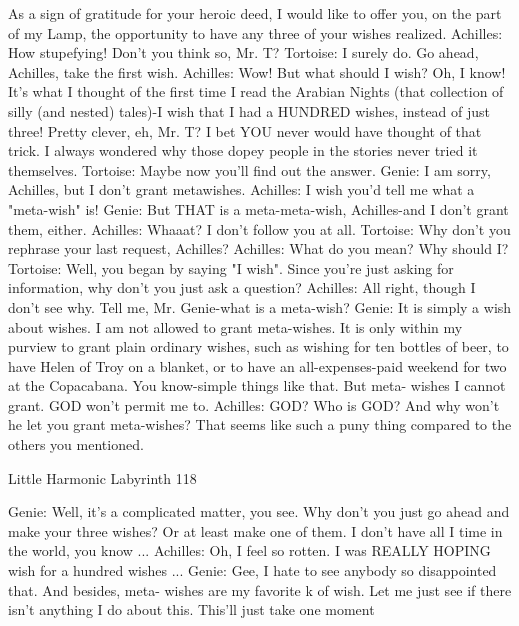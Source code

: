           As a sign of gratitude for your heroic deed, I would like to offer you, on the
                 part of my Lamp, the opportunity to have any three of your wishes
                 realized.
          Achilles: How stupefying! Don't you think so, Mr. T?
          Tortoise: I surely do. Go ahead, Achilles, take the first wish.
          Achilles: Wow! But what should I wish? Oh, I know! It's what I thought of
                 the first time I read the Arabian Nights (that collection of silly (and
                 nested) tales)-I wish that I had a HUNDRED wishes, instead of just
                 three! Pretty clever, eh, Mr. T? I bet YOU never would have thought
                 of that trick. I always wondered why those dopey people in the stories
                 never tried it themselves.
          Tortoise: Maybe now you'll find out the answer.
          Genie: I am sorry, Achilles, but I don't grant metawishes.
          Achilles: I wish you'd tell me what a "meta-wish" is!
          Genie: But THAT is a meta-meta-wish, Achilles-and I don't grant them,
                 either. Achilles: Whaaat? I don't follow you at all.
          Tortoise: Why don't you rephrase your last request, Achilles?
          Achilles: What do you mean? Why should I?
          Tortoise: Well, you began by saying "I wish". Since you're just asking for
                 information, why don't you just ask a question?
          Achilles: All right, though I don't see why. Tell me, Mr. Genie-what is a
                 meta-wish? Genie: It is simply a wish about wishes. I am not allowed
                 to grant meta-wishes. It is only within my purview to grant plain
                 ordinary wishes, such as wishing for ten bottles of beer, to have Helen
                 of Troy on a blanket, or to have an all-expenses-paid weekend for two
                 at the Copacabana. You know-simple things like that. But meta-
                 wishes I cannot grant. GOD won't permit me to.
          Achilles: GOD? Who is GOD? And why won't he let you grant meta-wishes?
                 That seems like such a puny thing compared to the others you
                 mentioned.




Little Harmonic Labyrinth                                                           118

          Genie: Well, it’s a complicated matter, you see. Why don’t you just go ahead
                 and make your three wishes? Or at least make one of them. I don't
                 have all I time in the world, you know ...
          Achilles: Oh, I feel so rotten. I was REALLY HOPING wish for a hundred
                 wishes ...
          Genie: Gee, I hate to see anybody so disappointed that. And besides, meta-
                 wishes are my favorite k of wish. Let me just see if there isn't anything
                 I do about this. This'll just take one moment

